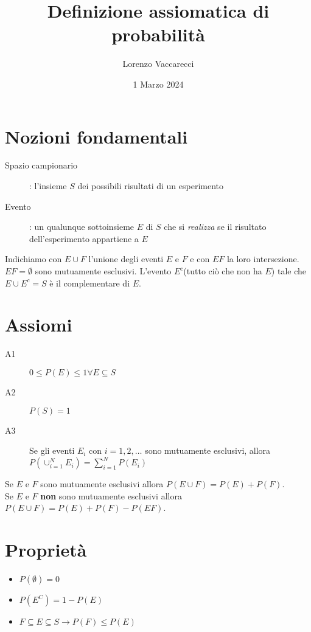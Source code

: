 \documentclass[12pt]{article}
\title{Definizione assiomatica di probabilità}
\author{Lorenzo Vaccarecci}
\date{1 Marzo 2024}
\begin{document}
\maketitle
\section{Nozioni fondamentali}
\begin{description}
    \item[Spazio campionario]: l'insieme \(S\) dei possibili risultati di un esperimento
    \item[Evento]: un qualunque sottoinsieme \(E\) di \(S\) che si \textit{realizza} se il risultato dell'esperimento appartiene a \(E\)  
\end{description}
Indichiamo con \(E \cup F\) l'unione degli eventi \(E\) e \(F\) e con \(EF\) la loro intersezione. \(EF=\emptyset\) sono mutuamente esclusivi. L'evento \(E^{c}\)(tutto ciò che non ha \(E\)) tale che \(E\cup E^{c}=S\) è il complementare di \(E\). 
\section{Assiomi}
\begin{description}
    \item[A1] \(0\leq P(E) \leq 1 \forall E \subseteq S\)
    \item[A2] \(P(S)=1\)
    \item[A3] Se gli eventi \(E_{i}\) con \(i=1,2,\dots\) sono mutuamente esclusivi, allora \(P(\cup_{i=1}^N E_{i})=\sum_{i = 1}^{N} P(E_{i})\)   
\end{description}
Se \(E \text{ e } F\) sono mutuamente esclusivi allora \(P(E \cup F)=P(E)+P(F)\).\\Se \(E \text{ e } F\) \textbf{non} sono mutuamente esclusivi allora \(P(E \cup F)=P(E)+P(F)-P(EF)\).
\section*{Proprietà}
\begin{itemize}
    \setlength\itemsep{0em}
    \item \(P(\emptyset)=0\)
    \item \(P(E^{C})=1-P(E)\)
    \item \(F\subseteq E \subseteq S \rightarrow P(F) \leq P(E)\)
\end{itemize}
\end{document}
